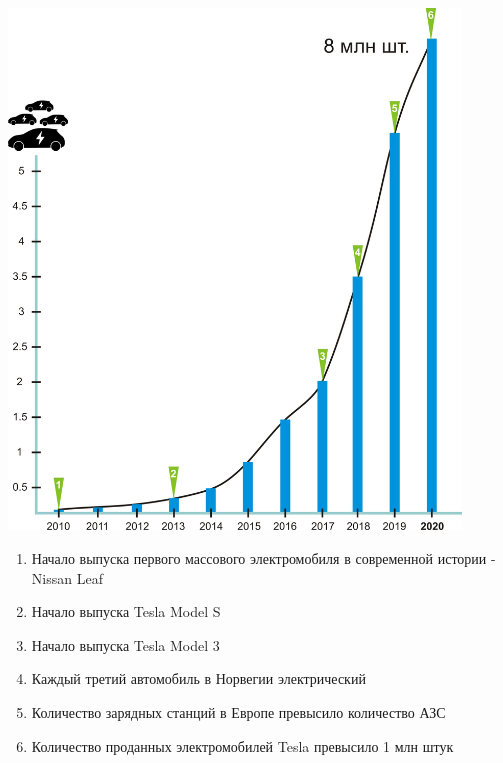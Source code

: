 \documentclass[a4paper,12pt]{report}
\begin{document}
\vspace*{1cm}
\includegraphics[width=12cm]{chart1}
\vspace*{1cm}

\begin{enumerate}
	\item Начало выпуска первого массового электромобиля в современной истории - Nissan Leaf
	\item Начало выпуска Tesla Model S
	\item Начало выпуска Tesla Model 3
	\item Каждый третий автомобиль в Норвегии электрический
	\item Количество зарядных станций в Европе превысило количество АЗС
	\item Количество проданных электромобилей Tesla превысило 1 млн штук
\end{enumerate}
\end{document}
